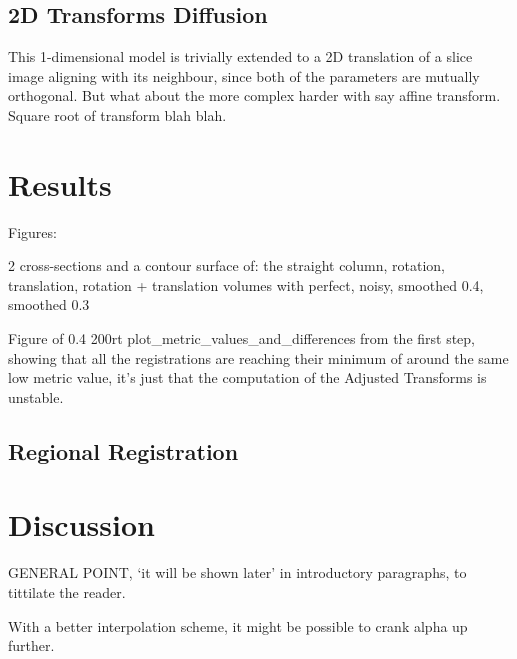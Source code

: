   \subsection{2D Transforms Diffusion} %
  \label{sub:2d_transforms_diffusion}
    This 1-dimensional model is trivially extended to a 2D translation of a slice image aligning with its neighbour, since both of the parameters are mutually orthogonal. But what about the more complex harder with say affine transform. Square root of transform blah blah.
  
  

\section{Results} %
\label{sec:results}
  
  Figures:
  
  2 cross-sections and a contour surface of:
    the straight column, rotation, translation, rotation + translation volumes
      with perfect, noisy, smoothed 0.4, smoothed 0.3
        
  Figure of 0.4 200rt plot\_metric\_values\_and\_differences from the first step, showing that all the registrations are reaching their minimum of around the same low metric value, it's just that the computation of the Adjusted Transforms is unstable.
  
  
  
  
  \subsection{Regional Registration} %
  \label{sub:regional_registration}
  


\section{Discussion} %
\label{sec:discussion}
  GENERAL POINT, `it will be shown later' in introductory paragraphs, to tittilate the reader.

  With a better interpolation scheme, it might be possible to crank alpha up further.
  
